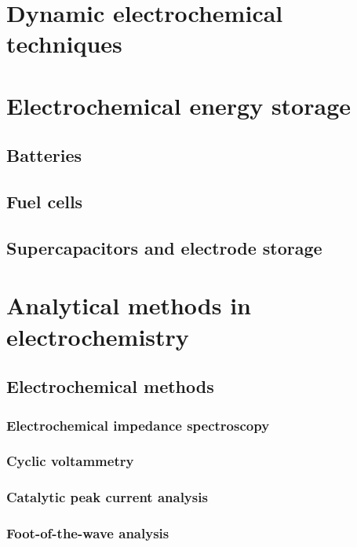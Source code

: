 \documentclass{article}
\numberwithin{theorem}{section}
\numberwithin{corollary}{section}
\numberwithin{postulate}{section}
\numberwithin{lemma}{section}
\numberwithin{definition}{section}
\begin{document}
\section{Dynamic electrochemical techniques}

\section{Electrochemical energy storage}

\subsection{Batteries}

\subsection{Fuel cells}

\subsection{Supercapacitors and electrode storage}

\section{Analytical methods in electrochemistry}

\subsection{Electrochemical methods}

\subsubsection{Electrochemical impedance spectroscopy}

\subsubsection{Cyclic voltammetry}

\subsubsection{Catalytic peak current analysis}

\subsubsection{Foot-of-the-wave analysis}
\end{document}
